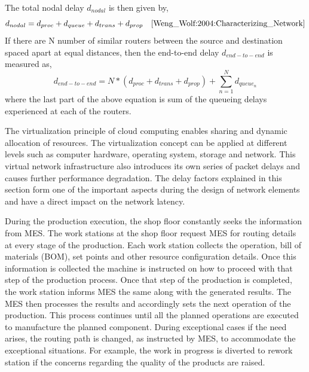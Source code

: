 \documentclass[10pt,conference,compsocconf]{IEEEtran}
\begin{document}
The total nodal delay $d_{nodal}$ is then given by,
\begin{equation*}
  d_{nodal} = d_{proc} + d_{queue} + d_{trans} + d_{prop}   \quad     \cite{Weng_Wolf:2004:Characterizing_Network}
\end{equation*}
If there are N number of similar routers between the source and destination spaced apart at equal distances, then the end-to-end delay $d_{end-to-end}$ is measured as, 
\begin{equation*}
  d_{end-to-end} = N*( d_{proc} +  d_{trans} + d_{prop}) + \sum_{n=1}^{N} d_{queue_n}
\end{equation*}
where the last part of the above equation is sum of the queueing delays experienced at each of the routers.

The virtualization principle of cloud computing enables sharing and dynamic allocation of resources. The virtualization concept can be applied at different levels such as computer hardware, operating system, storage and network. This virtual network infrastructure also introduces its own series of packet delays and causes further performance degradation.
The delay factors explained in this section form one of the important aspects during the design of network elements and have a direct impact on the network latency.


During the production execution, the shop floor constantly seeks the information from MES. The work stations at the shop floor request MES for routing details at every stage of the production. Each work station collects the operation, bill of materials (BOM), set points and other resource configuration details. Once this information is collected the machine is instructed on how to proceed with that step of the production process. Once that step of the production is completed, the work station informs MES the same along with the generated results. The MES then processes the results and accordingly sets the next operation of the production. This process continues until all the planned operations are executed to manufacture the planned component. During exceptional cases if the need arises, the routing path is changed, as instructed by MES, to accommodate the exceptional situations. For example, the work in progress is diverted to rework station if the concerns regarding the quality of the products are raised.
\end{document}
